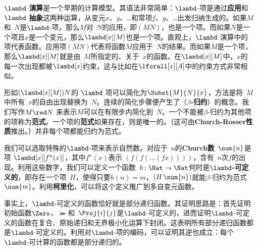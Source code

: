 \textbf{$\lambd$ 演算}是一个早期的计算模型。其语法非常简单：$\lambd$-项是通过\textbf{应用}和\textbf{$\lambd$ 抽象}这两种运算，从变元$x$、$y$、\dots{}和常项$f$、$g$、\dots{}出发归纳生成的。如果$M$和~$N$是$\lambd$-项，那么$M$对~$N$的应用，即$(MN)$，也是一个项。而如果$N$是一个项且$x$是一个变元，那么$\lambd[x][M]$也是一个项。直观上，$\lambd$ 演算中的项代表函数。应用项$(MN)$代表将函数$M$应用于~$N$的结果。而如果$M$是一个项，那么$\lambd[x][M]$就是由~$M$所指定的、关于~$x$的函数。在$\lambd[x][M]$中，$x$的每一次出现都被$\lambd[x]$约束，这与比如在$\lforall[x][A]$中的约束方式非常相似。

形如$(\lambd[x][M])N$的 $\lambd$ 项可以简化为$\Subst{M}{N}{x}$，方法是将~$M$中所有~$x$的自由出现替换为~$N$。连续的简化步骤便产生了（\textbf{$\beta$-归约}）的概念。我们写作$M \red N$ 来表示$M$可以在有限步内简化到~$N$。一个不能被$\beta$-归约为其他项的项称为\textbf{范式}。一个项的\textbf{范式}如果存在，则是唯一的。（这可由\textbf{Church-Rosser性质}推出。）并非每个项都能归约为范式。

我们可以选取特殊的$\lambd$-项来表示自然数。对应于~$n$的\textbf{Church数}~$\num{n}$是项 $\lambd[x][f^n(x)]$，其中$f^n(x)$表示 $(f(f(\dots(f x))))$，含有~$n$次$f$的出现。利用这些数字，我们可以定义一个函数~$h\colon \Nat \to \Nat$何时是\textbf{$\lambd$-可定义的}，即存在一个项~$H$，使得只要$h(n) = m$，$(H\, \num{n})$就能$\beta$-归约为范式~$\num{m}$。利用\textbf{柯里化}，可以将这个定义推广到多自变元函数。

事实上，$\lambd$-可定义的函数恰好就是部分递归函数。其证明思路是：首先证明初始函数$\Zero$、$\Succ$和~$\Proj{i}{j}$是$\lambd$-可定义的，进而证明$\lambd$-可定义的函数在复合、原始递归和无界极小化运算下封闭。这表明所有部分递归函数都是$\lambd$-可定义的。利用对$\lambd$-项的编码，可以证明其逆也成立：每个$\lambd$-可计算的函数都是部分递归的。